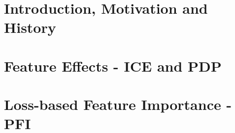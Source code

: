 \documentclass[11pt,compress,t,notes=noshow, aspectratio=169, xcolor=table]{beamer}
\begin{document}


\section{Introduction, Motivation and History}








\section{Feature Effects - ICE and PDP}






% 

\section{Loss-based Feature Importance - PFI}


%
\end{document}
